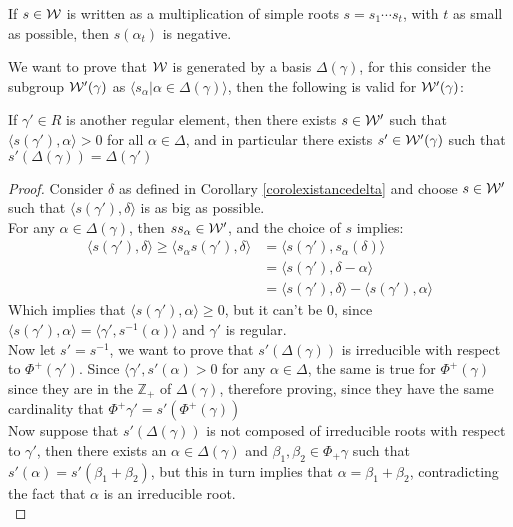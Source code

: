 \begin{corol}
	If $s \in \mathcal{W}$ is written as a multiplication of simple roots $s=s_1\cdots s_t$, with $t$ as small as possible, then $s(\alpha_t)$ is negative.
	\label{Wcorolsimple}
\end{corol}
We want to prove that $\mathcal{W}$ is generated by a basis $\Delta(\gamma)$, for this consider the subgroup $\mathcal{W}'(\gamma)$ as $\langle s_\alpha | \alpha \in \Delta(\gamma)\rangle$, then the following is valid for $\mathcal{W}'(\gamma)$:
\begin{teo}
	If $\gamma' \in R$ is another regular element, then there exists $s \in \mathcal{W}'$ such that $\langle s(\gamma'),\alpha \rangle >0$ for all $\alpha \in \Delta$, and in particular there exists $s' \in \mathcal{W}'(\gamma)$ such that $s'(\Delta(\gamma)) = \Delta(\gamma')$ 
	\label{32conjugacychambers}
\end{teo}
\begin{proof}
	Consider $\delta$ as defined in Corollary \ref{corolexistancedelta} and choose $s \in \mathcal{W}'$ such that $\langle s(\gamma'),\delta\rangle $ is as big as possible.\\
	For any $\alpha \in \Delta(\gamma)$, then $ss_\alpha \in \mathcal{W}'$, and the choice of $s$ implies:
	\begin{align*}
		\langle s(\gamma'),\delta\rangle \ge \langle s_\alpha s(\gamma'),\delta\rangle  &= \langle s(\gamma'),s_\alpha(\delta)\rangle \\
		&= \langle s(\gamma'), \delta - \alpha \rangle \\
		&= \langle s(\gamma'),\delta \rangle - \langle s(\gamma'),\alpha\rangle 
	\end{align*}
	Which implies that $\langle s(\gamma'), \alpha \rangle \ge 0$, but it can't be $0$, since $\langle s(\gamma'),\alpha \rangle = \langle \gamma', s^{-1}(\alpha)\rangle$ and $\gamma'$ is regular.\\
	Now let $s'=s^{-1}$, we want to prove that $s'(\Delta(\gamma))$ is irreducible with respect to $\Phi^+(\gamma')$. Since $\langle \gamma', s'(\alpha) > 0$ for any $\alpha \in \Delta$, the same is true for $\Phi^+(\gamma)$ since they are in the $\mathbb{Z}_+$ of $\Delta(\gamma)$, therefore proving, since they have the same cardinality that $\Phi^+{\gamma'} = s'(\Phi^+(\gamma))$\\
	Now suppose that $s'(\Delta(\gamma))$ is not composed of irreducible roots with respect to $\gamma'$, then there exists an $\alpha \in \Delta(\gamma)$  and $\beta_1,\beta_2 \in \Phi_+{\gamma} $ such that $s'(\alpha) = s'(\beta_1 + \beta_2)$, but this in turn implies that $\alpha = \beta_1 + \beta_2$, contradicting the fact that $\alpha$ is an irreducible root.\\
\end{proof}
